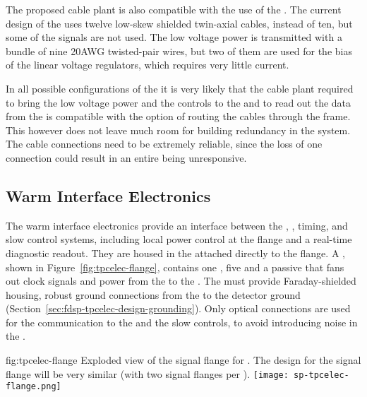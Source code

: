 The proposed cable plant is also compatible with the use of the 
. The current design of the   uses 
twelve low-skew shielded twin-axial cables, instead of ten, but some of
the signals are not used. The low voltage power is transmitted with a 
bundle of nine \num{20}{AWG} twisted-pair wires, but two of them are
used for the bias of the linear voltage regulators, which requires very
little current.

In all possible configurations of the  it is very likely that
the cable plant required to bring the low voltage power and the controls
to the  and to read out the data from the  is
compatible with the option of routing the cables through the 
frame. This however does not leave much room for building redundancy in
the system. The cable connections need to be extremely reliable, since
the loss of one connection could result in an entire  being
unresponsive.

\subsection{Warm Interface Electronics}
\label{sec:fdsp-tpcelec-design-warm}

The warm interface electronics provide an interface between the 
, , timing, and slow control systems, including 
local power control at the flange and a real-time diagnostic readout. 
They are housed in the  attached directly to the  
flange.  %
A , shown in Figure~\ref{fig:tpcelec-flange}, 
contains one , %
 five %
 and a passive 
that fans out clock signals and  power from the  to the 
. The  must provide Faraday-shielded housing, 
robust ground connections from the  to the detector ground 
(Section~\ref{sec:fdsp-tpcelec-design-grounding}). Only optical
connections are used for the communication to the  and the
slow controls, to avoid introducing noise in the  \fdth.

\begin{dunefigure}
{fig:tpcelec-flange}
{Exploded view of the  signal flange for .  
The design for the   
signal flange will be very similar (with two  signal flanges per \fdth).}
\texttt{[image: sp-tpcelec-flange.png]}
\end{dunefigure}

